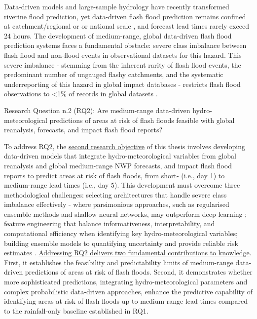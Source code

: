 Data-driven  models \citep{Nearing_2024} and large-sample hydrology \citep{Kratzert_2024} have recently transformed riverine flood prediction, yet data-driven flash flood prediction remains confined at catchment/regional or \citep{Song_2020, Saleh_2024, Ding_2025, Zhao_2025} or national scale \citep{Zhao_2022}, and forecast lead times rarely exceed 24 hours. The development of medium-range, global data-driven flash flood prediction systems faces a fundamental obstacle: severe class imbalance between flash flood and non-flood events in observational datasets for this hazard. This severe imbalance - stemming from the inherent rarity of flash flood events, the predominant number of ungauged flashy catchments, and the systematic underreporting of this hazard in global impact databases - restricts flash flood observations to <1\% of records in global datasets \citep{Panwar_2020, Kratzert_2023, Färber_2024, Jonkman_2024}.

\begin{tcolorbox}[
  colframe=colour_chapter6,  
  colback=white,           
  sharp corners,        
  boxrule=2mm,          
  left=0mm,             
  right=0mm,            
  toprule=0mm,          
  bottomrule=0mm,       
  rightrule=2mm        
]
{\color{colour_chapter6} {\setlength{\parindent}{1.0em} Research Question n.2 (RQ2): Are medium-range data-driven hydro-meteorological predictions of areas at risk of flash floods feasible with global reanalysis, forecasts, and impact flash flood reports?
}}
\end{tcolorbox}

\noindent To address RQ2, the \uline{second research objective} of this thesis involves developing data-driven models that integrate hydro-meteorological variables from global reanalysis and global medium-range NWP forecasts, and impact flash flood reports to predict areas at risk of flash floods, from short- (i.e., day 1) to medium-range lead times (i.e., day 5). This development must overcome three methodological challenges: selecting architectures that handle severe class imbalance effectively - where parsimonious approaches, such as regularised ensemble methods and shallow neural networks, may outperform deep learning \citep{Kumar_2021, Xu_2022, Luo_2025a}; feature engineering that balance informativeness, interpretability, and computational efficiency when identifying key hydro-meteorological variables; building ensemble models to quantifying uncertainty and provide reliable risk estimates \citep{Saleh_2024}. \uline{Addressing RQ2 delivers two fundamental contributions to knowledge}. First, it establishes the feasibility and predictability limits of medium-range data-driven predictions of areas at risk of flash floods. Second, it demonstrates whether more sophisticated predictions, integrating hydro-meteorological parameters and complex probabilistic data-driven approaches, enhance the predictive capability of identifying areas at risk of flash floods up to medium-range lead times compared to the rainfall-only baseline established in RQ1. 

